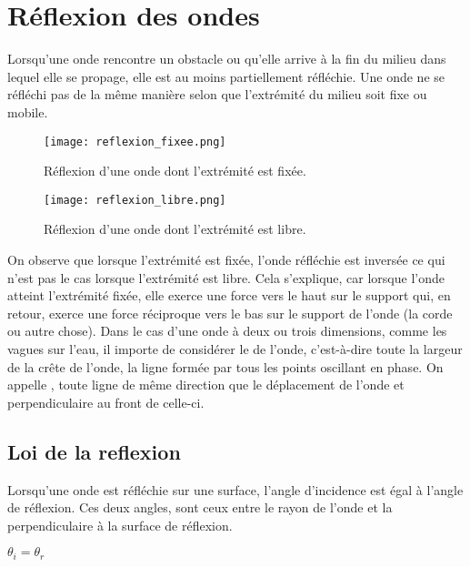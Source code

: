 \section{Réflexion des ondes}
Lorsqu'une onde rencontre un obstacle ou qu'elle arrive à la fin du milieu dans lequel elle se propage, elle est au moins partiellement réfléchie.
Une onde ne se réfléchi pas de la même manière selon que l'extrémité du milieu soit fixe ou mobile.
\begin{figure}[h]
    \begin{minipage}{.5\textwidth}
        \centering
        \texttt{[image: reflexion\_fixee.png]}
        \caption{Réflexion d'une onde dont l'extrémité est fixée.}
    \end{minipage}
    \begin{minipage}{.5\textwidth}
        \centering
        \texttt{[image: reflexion\_libre.png]}
        \caption{Réflexion d'une onde dont l'extrémité est libre.}
    \end{minipage}
\end{figure}
On observe que lorsque l'extrémité est fixée, l'onde réfléchie est inversée ce qui n'est pas le cas lorsque l'extrémité est libre. Cela s'explique, car lorsque l'onde atteint l'extrémité fixée, elle exerce une force vers le haut sur le support qui, en retour, exerce une force réciproque vers le bas sur le support de l'onde (la corde ou autre chose).
Dans le cas d'une onde à deux ou trois dimensions, comme les vagues sur l'eau, il importe de considérer le  de l'onde, c'est-à-dire toute la largeur de la crête de l'onde, la ligne formée par tous les points oscillant en phase.
On appelle , toute ligne de même direction que le déplacement de l'onde et perpendiculaire au front de celle-ci.

\newpage

\subsection{Loi de la reflexion}
Lorsqu'une onde est réfléchie sur une surface, l'angle d'incidence est égal à l'angle de réflexion. Ces deux angles, sont ceux entre le rayon de l'onde et la perpendiculaire à la surface de réflexion.
\begin{encadre}
    \(\theta_i = \theta_r\)
\end{encadre}

